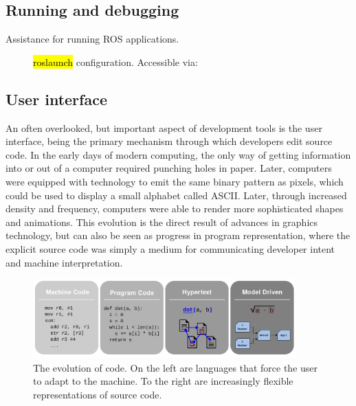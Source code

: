 \documentclass[12pt,initial,twoside,maitrise]{dms}
\newcommand{\inline}[1]{%
\begingroup%
\sethlcolor{slightgray}%
\hl{\ttfamily\small #1}%
\endgroup
}
\numberwithin{equation}{section}
\numberwithin{table}{chapter}
\numberwithin{figure}{chapter}
\begin{document}
\subsection{Running and debugging}

Assistance for running ROS applications.

\begin{figure}
    \centering
    \caption{\inline{roslaunch} configuration. Accessible via: }
    \label{fig:ros_run_config}
\end{figure}


\subsection{User interface}

An often overlooked, but important aspect of development tools is the user interface, being the primary mechanism through which developers edit source code. In the early days of modern computing, the only way of getting information into or out of a computer required punching holes in paper. Later, computers were equipped with technology to emit the same binary pattern as pixels, which could be used to display a small alphabet called ASCII. Later, through increased density and frequency, computers were able to render more sophisticated shapes and animations. This evolution is the direct result of advances in graphics technology, but can also be seen as progress in program representation, where the explicit source code was simply a medium for communicating developer intent and machine interpretation.

\begin{figure}
    \centering
    \includegraphics[width=0.90\textwidth]{progress_in_program.png}
    \caption{The evolution of code. On the left are languages that force the user to adapt to the machine. To the right are increasingly flexible representations of source code.}
    \label{fig:evolution_of_programming}
\end{figure}
\end{document}
